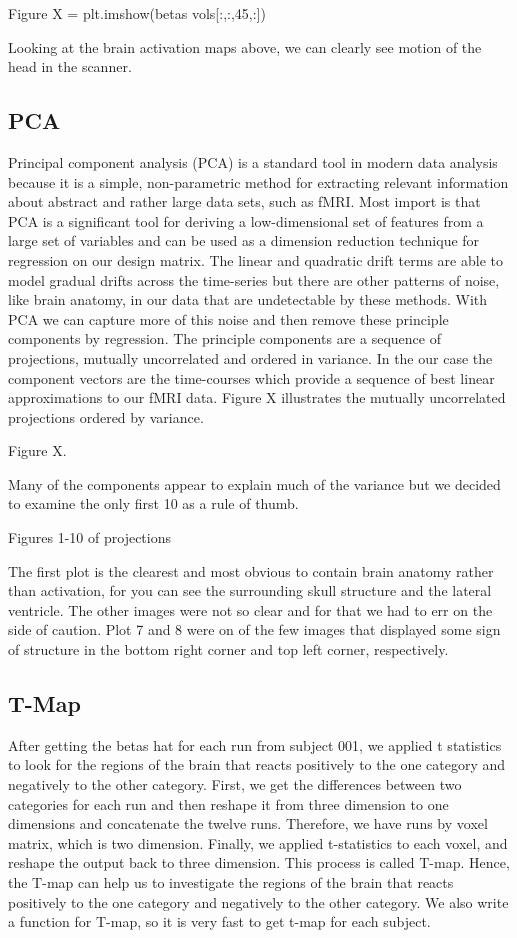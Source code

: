 \documentclass[11pt]{article}
\begin{document}
      Figure X = plt.imshow(betas vols[:,:,45,:])


Looking at the brain activation maps above, we can clearly see motion of the 
head in the scanner. 

\subsection{PCA}
Principal component analysis (PCA) is a standard tool in modern data analysis 
because it is a simple, non-parametric method for extracting relevant 
information about abstract and rather large data sets, such as fMRI.  Most 
import is that PCA is a significant tool for deriving a low-dimensional set of 
features from a large set of variables and can be used as a dimension reduction 
technique for regression on our design matrix. The linear and quadratic drift 
terms are able to model gradual drifts across the time-series but there are 
other patterns of noise, like brain anatomy, in our data that are undetectable 
by these methods. With PCA we can capture more of this noise and then remove 
these principle components by regression. The principle components are a 
sequence of projections, mutually uncorrelated and ordered in variance. In the 
our case the component vectors are the time-courses which provide a sequence of 
best linear approximations to our fMRI data.  Figure X illustrates the mutually 
uncorrelated projections ordered by variance.

	Figure X.

Many of the  components appear to explain much of the variance but we decided 
to examine the only first 10 as a rule of thumb.

	Figures 1-10 of projections

The first plot is the clearest and most obvious to contain brain anatomy rather 
than activation, for you can see the surrounding skull structure and the 
lateral ventricle. The other images were not so clear and for that we had to 
err on the side of caution. Plot 7 and 8 were on of the few images that 
displayed some sign of structure in the bottom right corner and top left 
corner, respectively.

\subsection{T-Map}
After getting the betas hat for each run from subject 001, we applied t statistics to look for the regions of the brain that reacts positively to the one category and negatively to the other category. First, we get the differences between two categories for each run and then reshape it from three dimension to one dimensions and concatenate the twelve runs. Therefore, we have runs by voxel matrix, which is two dimension.  Finally, we applied t-statistics to each voxel, and reshape the output back to three dimension. This process is called T-map.  Hence, the T-map can help us to investigate the regions of the brain that reacts positively to the one category and negatively to the other category. We also write a function for T-map, so it is very fast to get t-map for  each subject.
\end{document}
